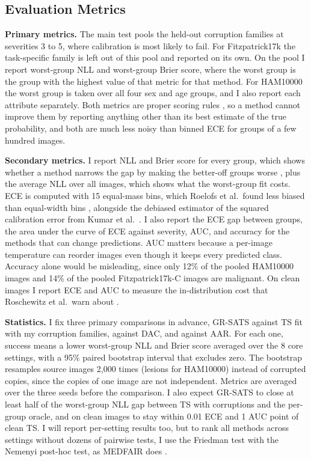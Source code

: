 \documentclass[sigconf,nonacm]{acmart}
\begin{document}
\subsection{Evaluation Metrics}
\label{sec:metrics}

\textbf{Primary metrics.} The main test pools the held-out corruption families at severities 3 to 5, where calibration is most likely to fail. For Fitzpatrick17k the task-specific family is left out of this pool and reported on its own. On the pool I report worst-group NLL and worst-group Brier score, where the worst group is the group with the highest value of that metric for that method. For HAM10000 the worst group is taken over all four sex and age groups, and I also report each attribute separately. Both metrics are proper scoring rules \cite{brier1950verification,gruber2022proper}, so a method cannot improve them by reporting anything other than its best estimate of the true probability, and both are much less noisy than binned ECE for groups of a few hundred images.

\textbf{Secondary metrics.} I report NLL and Brier score for every group, which shows whether a method narrows the gap by making the better-off groups worse \cite{zong2023medfair}, plus the average NLL over all images, which shows what the worst-group fit costs. ECE is computed with 15 equal-mass bins, which Roelofs et al.\ found less biased than equal-width bins \cite{roelofs2022mitigating}, alongside the debiased estimator of the squared calibration error from Kumar et al.\ \cite{kumar2019verified}. I also report the ECE gap between groups, the area under the curve of ECE against severity, AUC, and accuracy for the methods that can change predictions. AUC matters because a per-image temperature can reorder images even though it keeps every predicted class. Accuracy alone would be misleading, since only 12\% of the pooled HAM10000 images and 14\% of the pooled Fitzpatrick17k-C images are malignant. On clean images I report ECE and AUC to measure the in-distribution cost that Roschewitz et al.\ warn about \cite{roschewitz2025where}.

\textbf{Statistics.} I fix three primary comparisons in advance, GR-SATS against TS fit with my corruption families, against DAC, and against AAR. For each one, success means a lower worst-group NLL and Brier score averaged over the 8 core settings, with a 95\% paired bootstrap interval that excludes zero. The bootstrap resamples source images 2,000 times (lesions for HAM10000) instead of corrupted copies, since the copies of one image are not independent. Metrics are averaged over the three seeds before the comparison. I also expect GR-SATS to close at least half of the worst-group NLL gap between TS with corruptions and the per-group oracle, and on clean images to stay within 0.01 ECE and 1 AUC point of clean TS. I will report per-setting results too, but to rank all methods across settings without dozens of pairwise tests, I use the Friedman test with the Nemenyi post-hoc test, as MEDFAIR does \cite{zong2023medfair}.
\end{document}
